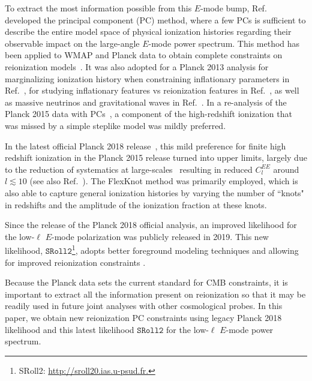 \documentclass[prd,twocolumn,amsmath,amssymb,floatfix,superscriptaddress,nofootinbib]{revtex4-1}
\begin{document}
To extract the most information possible from this $E$-mode bump, Ref.~\cite{Hu:2003gh, Mortonson:2007hq} developed the principal component (PC) method, where a few PCs is sufficient to describe the entire model space of physical ionization histories regarding their observable impact on the large-angle $E$-mode power spectrum. This method has been applied to WMAP and Planck data to obtain complete constraints on reionization models~\cite{Mortonson:2008rx, Mortonson:2007hq, Heinrich:2016ojb, Aghanim:2018eyx}. It was also adopted for a Planck 2013 analysis for marginalizing ionization history when constraining inflationary parameters in Ref.~\cite{Planck:2013jfk}, for studying inflationary features vs reionization features in Ref.~\cite{Obied:2018qdr}, as well as massive neutrinos and gravitational waves in Ref.~\cite{Dai:2015dwa}. %
In a re-analysis of the Planck 2015 data with PCs~\cite{Heinrich:2016ojb}, a component of the high-redshift ionization that was missed by a simple steplike model was mildly preferred. 


In the latest official Planck 2018 release~\cite{Aghanim:2018eyx},  this mild preference for finite high redshift ionization in the Planck 2015 release turned into upper limits, largely due to the reduction of systematics at large-scales~\cite{Aghanim:2018eyx, Millea:2018bko} resulting in reduced $C_l^{EE}$ around $l \lesssim 10$ (see also Ref.~\cite{Heinrich:2018btc}). The FlexKnot method was primarily employed, which is also able to capture general ionization histories by varying the number of ``knots" in redshifts and the amplitude of the ionization fraction at these knots. 

Since the release of the Planck 2018 official analysis, an improved likelihood for the low-$\ell$ $E$-mode polarization was publicly released in 2019. This new likelihood,
$\texttt{SRoll2}$\footnote{SRoll2: \url{http://sroll20.ias.u-psud.fr.}}, adopts better foreground modeling techniques and allowing for improved reionization constraints \cite{Delouis:2019bub}.

Because the Planck data sets the current standard for CMB constraints, it is important to extract all the information present on reionization  so that it may be readily used in future joint analyses with other cosmological probes. In this paper, we obtain new reionization PC constraints using legacy Planck 2018 likelihood and this latest likelihood $\texttt{SRoll2}$ for the low-$\ell$ $E$-mode power spectrum. 
\end{document}
